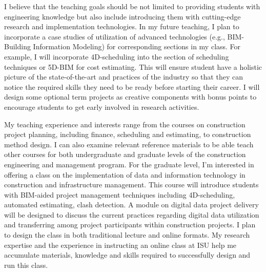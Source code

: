 \documentclass[a4paper,11pt]{article}
\begin{document}
I believe that the teaching goals should be not limited to providing students with engineering knowledge but also include introducing them with cutting-edge research and implementation technologies. In my future teaching, I plan to incorporate a case studies of utilization of advanced technologies (e.g., BIM-Building Information Modeling) for corresponding sections in my class. For example, I will incorporate 4D-scheduling into the section of scheduling techniques or 5D-BIM for cost estimating. This will ensure student have a holistic picture of the state-of-the-art and practices of the industry so that they can notice the required skills they need to be ready before starting their career. I will design some optional term projects as creative components with bonus points to encourage students to get early involved in research activities. 
%

\par
%
My teaching experience and interests range from the courses on construction project planning, including finance, scheduling and estimating, to construction method design. I can also examine relevant reference materials to be able teach other courses for both undergraduate and graduate levels of the construction engineering and management program. 
%
For the graduate level, I'm interested in offering a class on the implementation of data and information technology in construction and infrastructure management. This course will introduce students with BIM-aided project management techniques including 4D-scheduling, automated estimating, clash detection. A module on digital data project delivery will be designed to discuss the current practices regarding digital data utilization and transferring among project participants within construction projects. I plan to design the class in both traditional lecture and online formats. My research expertise and the experience in instructing an online class at ISU help me accumulate materials, knowledge and skills required to successfully design and run this class.
\end{document}
